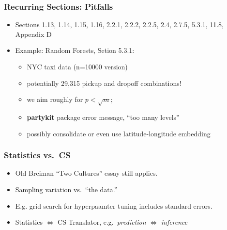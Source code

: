 \documentclass{beamer}
\begin{document}
\begin{frame} 
\frametitle{Recurring Sections: Pitfalls}\pause

\begin{itemize}

\item Sections 1.13, 1.14, 1.15, 1.16, 2.2.1, 2.2.2, 2.2.5, 2.4, 2.7.5,
5.3.1, 11.8, Appendix D

\item Example: Random Forests, Setion 5.3.1: 

   \begin{itemize}
   
   \item NYC taxi data (n=10000 version) 
   
   \item potentially 29,315
   pickup and dropoff combinations! 
   
   \item we aim roughly for $p < \sqrt{m}$;
   
   \item \textbf{partykit} package error message, ``too many levels'' 
   
   \item possibly consolidate or even use latitude-longitude embedding
   
   \end{itemize} 

\end{itemize} 

\end{frame} 

\begin{frame} 
\frametitle{Statistics vs.\ CS}\pause

\begin{itemize} 

\item Old Breiman ``Two Cultures'' essay still applies.

\item Sampling variation vs.\ ``the data.''

\item E.g. grid search for hyperpaamter tuning includes standard errors.

\item Statistics $\iff$ CS Translator, e.g.\ \textit{prediction}
$\iff$ \textit{inference}

\end{itemize} 

\end{frame}
\end{document}
